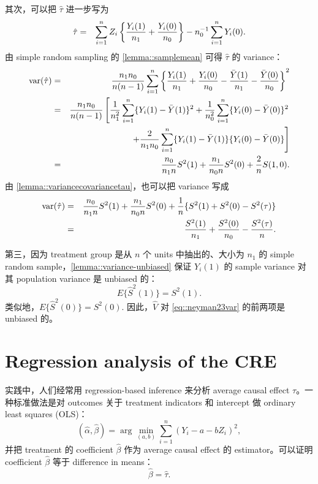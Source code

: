 其次，可以把 $\hat{\tau}$ 进一步写为
\begin{eqnarray*}
\hat{\tau} &=&  \sum_{i=1}^n Z_i  \left\{    \frac{  Y_i(1) }{ n_1 } + \frac{  Y_i(0) }{ n_0 }   \right\}
- n_0^{-1} \sum_{i=1}^n Y_i(0).
\end{eqnarray*}
由 simple random sampling 的 \cref{lemma::samplemean} 可得 $\hat{\tau}$ 的 variance：
\begin{eqnarray*}
\textup{var}(\hat{\tau}) &=&  \frac{  n_1 n_0  }{  n(n-1)  }  \sum_{i=1}^n
\left\{    \frac{  Y_i(1) }{ n_1 } + \frac{  Y_i(0) }{ n_0 }  -  \frac{  \bar{Y}(1) }{ n_1 } - \frac{  \bar{Y}(0) }{ n_0 }    \right\}^2 \\
&=&  \frac{  n_1 n_0  }{  n(n-1)  }  \left[
\frac{1}{n_1^{2}}   \sum_{i=1}^n  \{  Y_i(1) -  \bar{Y}(1)\}^2 + \frac{1}{n_0^{2}}  \sum_{i=1}^n  \{  Y_i(0) -  \bar{Y}(0)\}^2 \right. \\
&& \left. \qquad \qquad
+ \frac{2}{n_1 n_0}  \sum_{i=1}^n  \{  Y_i(1) -  \bar{Y}(1)\}  \{  Y_i(0) -  \bar{Y}(0)\}
\right]\\
&=& \frac{n_0}{n_1n} S^2(1) + \frac{n_1}{n_0n}S^2(0) + \frac{2}{n} S(1,0).
\end{eqnarray*}
由 \cref{lemma::variancecovariancetau}，也可以把 variance 写成
\begin{eqnarray*}
\textup{var}(\hat{\tau})
&=& \frac{n_0}{n_1n} S^2(1) + \frac{n_1}{n_0n}S^2(0) + \frac{1}{n} \{ S^2(1)+S^2(0) - S^2(\tau) \}\\
&=&  \frac{S^2(1)}{n_1} + \frac{S^2(0)}{n_0} - \frac{S^2(\tau)}{n}.
\end{eqnarray*}

第三，因为 treatment group 是从 $n$ 个 units 中抽出的、大小为 $n_1$ 的 simple random sample，\cref{lemma::variance-unbiased} 保证 $Y_i(1)$ 的 sample variance 对其 population variance 是 unbiased 的：
$$
E\{  \hat{S}^2(1) \} = S^2(1).
$$
类似地，$E\{  \hat{S}^2(0) \} = S^2(0).$ 因此，$\hat{V} $ 对 \eqref{eq::neyman23var} 的前两项是 unbiased 的。




 \section{Regression analysis of the CRE}



实践中，人们经常用 regression-based inference 来分析 average causal effect $\tau$。一种标准做法是对 outcomes 关于 treatment indicators 和 intercept 做 ordinary least squares (OLS)：
$$
(\hat\alpha, \hat\beta) = \arg\min_{(a,b)} \sum_{i=1}^n (Y_i - a - bZ_i)^2,
$$
并把 treatment 的 coefficient $ \hat\beta$ 作为 average causal effect 的 estimator。可以证明 coefficient $ \hat\beta$ 等于 difference in means：
\begin{equation}
\label{eq::ols-difference-in-means}
\hat\beta = \hat\tau .
\end{equation}

